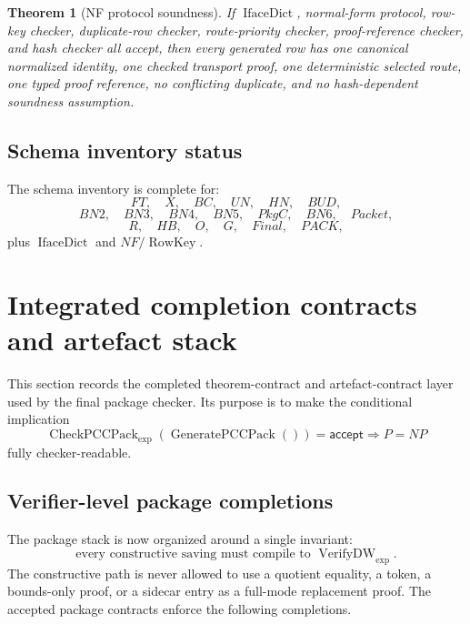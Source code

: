 \documentclass[10.5pt,a4paper]{article}
\newtheorem{theorem}{Theorem}[section]
\newcommand{\VerifyDW}{\operatorname{VerifyDW}_{\exp}}
\newcommand{\CheckPack}{\operatorname{CheckPCCPack}_{\exp}}
\newcommand{\GenPack}{\operatorname{GeneratePCCPack}}
\newcommand{\IfaceDict}{\operatorname{IfaceDict}}
\newcommand{\RowKey}{\operatorname{RowKey}}
\begin{document}
\begin{theorem}[NF protocol soundness]
If \(\IfaceDict\), normal-form protocol, row-key checker, duplicate-row checker, route-priority checker, proof-reference checker, and hash checker all accept, then every generated row has one canonical normalized identity, one checked transport proof, one deterministic selected route, one typed proof reference, no conflicting duplicate, and no hash-dependent soundness assumption.
\end{theorem}

\subsection{Schema inventory status}
The schema inventory is complete for:
\[
FT,
\quad X,
\quad BC,
\quad UN,
\quad HN,
\quad BUD,
\]
\[
BN2,
\quad BN3,
\quad BN4,
\quad BN5,
\quad PkgC,
\quad BN6,
\quad Packet,
\]
\[
R,
\quad HB,
\quad O,
\quad G,
\quad Final,
\quad PACK,
\]
plus \(\IfaceDict\) and \(NF/\RowKey\).


\section{Integrated completion contracts and artefact stack}

This section records the completed theorem-contract and artefact-contract layer used by the final package checker.  Its purpose is to make the conditional implication
\[
\CheckPack(\GenPack())=\mathsf{accept}\Longrightarrow P=NP
\]
fully checker-readable.

\subsection{Verifier-level package completions}
The package stack is now organized around a single invariant:
\[
\text{every constructive saving must compile to }\VerifyDW.
\]
The constructive path is never allowed to use a quotient equality, a token, a bounds-only proof, or a sidecar entry as a full-mode replacement proof.  The accepted package contracts enforce the following completions.
\end{document}
